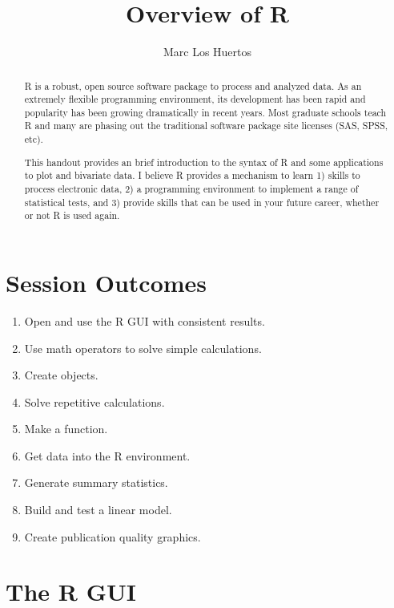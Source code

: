 \documentclass{tufte-handout}\usepackage[]{graphicx}\usepackage[]{color}
\title{Overview of R %
}
\author[Marc Los Huertos]{Marc Los Huertos}
\date{}  %
\begin{document}
\maketitle%
\begin{abstract}
\noindent R is a robust, open source software package to process and analyzed data. As an extremely flexible programming environment, its development has been rapid and popularity has been growing dramatically in recent years. Most graduate schools teach R and many are phasing out the traditional software package site licenses (\eg SAS, SPSS, etc). 

This handout provides an brief introduction to the syntax of R and some applications to plot and bivariate data. I believe R provides a mechanism to learn 1) skills to process electronic data, 2) a programming environment to implement a range of statistical tests, and 3) provide skills that can be used in your future career, whether or not R is used again.
\end{abstract}




\section{Session Outcomes}
\begin{enumerate}
	\item Open and use the R GUI with consistent results.
	\item Use math operators to solve simple calculations.
	\item Create objects.
	\item Solve repetitive calculations.
	\item Make a function.
	\item Get data into the R environment.
	\item Generate summary statistics.
	\item Build and test a linear model.
	\item Create publication quality graphics.
\end{enumerate}

\section{The R GUI}
\end{document}
